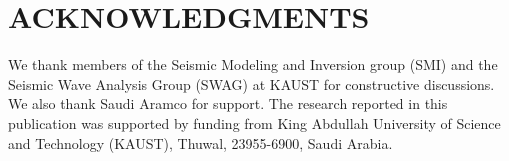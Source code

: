 \documentclass[paper,twocolomn]{geophysics}
\begin{document}
\section{ACKNOWLEDGMENTS}

We thank members of the Seismic Modeling and Inversion group (SMI) and the Seismic Wave Analysis Group (SWAG) at KAUST for constructive discussions. We also thank Saudi Aramco for support.
The research reported in this publication was supported by funding from King Abdullah University of Science and Technology (KAUST), Thuwal, 23955-6900, Saudi Arabia.




\newpage


\end{document}
